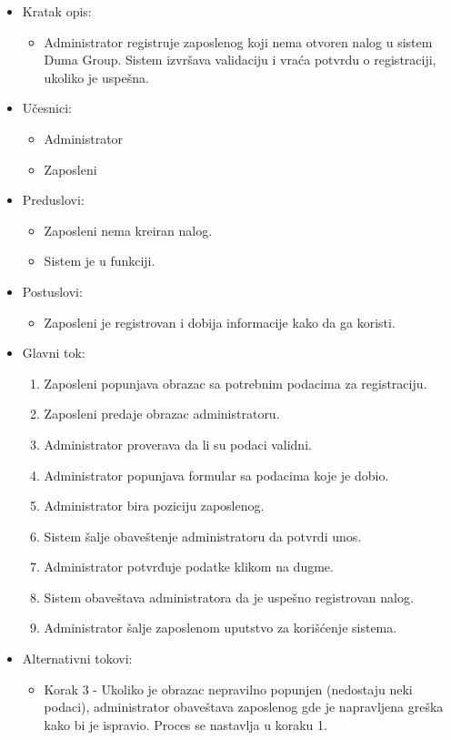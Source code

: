 \documentclass[a4paper]{article}
\begin{document}
\begin{itemize}
    \item Kratak opis: 
    \begin{itemize}
        \item Administrator registruje zaposlenog koji nema otvoren nalog u sistem Duma Group. Sistem izvršava validaciju i vraća potvrdu o registraciji, ukoliko je uspešna.
    \end{itemize}
    \item Učesnici:
        \begin{itemize}
        \item Administrator
        \item Zaposleni
    \end{itemize}
    \item Preduslovi:
        \begin{itemize}
            \item Zaposleni nema kreiran nalog.
            \item Sistem je u funkciji.
        \end{itemize}
    \item Postuslovi:
        \begin{itemize}
            \item Zaposleni je registrovan i dobija informacije kako da ga koristi.
        \end{itemize}
    \item Glavni tok:
        \begin{enumerate}
            \item Zaposleni popunjava obrazac sa potrebnim podacima za registraciju.
            \item Zaposleni predaje obrazac administratoru.
            \item Administrator proverava da li su podaci validni.
            \item Administrator popunjava formular sa podacima koje je dobio.
            \item Administrator bira poziciju zaposlenog.
            \item Sistem šalje obaveštenje administratoru da potvrdi unos.
            \item Administrator potvrđuje podatke klikom na dugme.
            \item Sistem obaveštava administratora da je uspešno registrovan nalog.
            \item Administrator šalje zaposlenom uputstvo za korišćenje sistema.
        \end{enumerate}
    \item Alternativni tokovi:
        \begin{itemize}
            \item Korak 3 - Ukoliko je obrazac nepravilno popunjen (nedostaju neki podaci), administrator obaveštava zaposlenog gde je napravljena greška kako bi je ispravio. Proces se nastavlja u koraku 1.
        \end{itemize}
\end{itemize}
\end{document}
